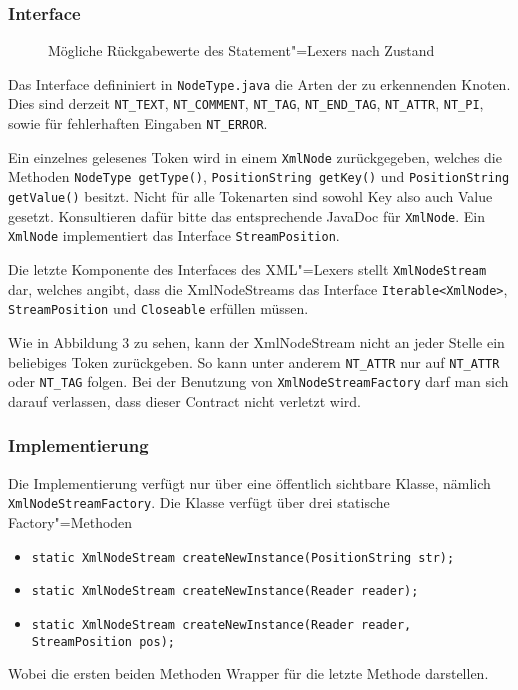 \documentclass[10pt,a4paper,ngerman,titlepage,tocindentauto]{scrartcl}
\newcommand{\n}{\linebreak[1]}
\begin{document}
			\subsubsection*{Interface}
				\begin{wrapfigure}{R}{0.3\textwidth}
					\caption{Mög\-li\-che Rück\-ga\-be\-wer\-te des State\-ment"=Le\-xers nach Zu\-stand}
					\fbox{\centering
						\texttt{[image: graphiken/Ausgaben.pdf]}
					}
				\end{wrapfigure}
				
				Das Interface defininiert in \texttt{NodeType.java} die Arten der zu erkennenden Knoten.
				Dies sind derzeit \texttt{NT\_TEXT}, \texttt{NT\_COMMENT}, \texttt{NT\_TAG}, \texttt{NT\_END\_TAG},
				\texttt{NT\_ATTR}, \texttt{NT\_PI}, sowie für fehlerhaften Eingaben \texttt{NT\_ERROR}.
				
				Ein einzelnes gelesenes Token wird in einem \texttt{XmlNode} zurückgegeben, welches die Methoden
				\texttt{NodeType getType()}, \texttt{PositionString getKey()} und \texttt{PositionString getValue()}
				besitzt. Nicht für alle Tokenarten sind sowohl Key also auch Value gesetzt. Konsultieren dafür
				bitte das entsprechende JavaDoc für \texttt{XmlNode}. Ein \texttt{XmlNode} implementiert das Interface
				\texttt{StreamPosition}.
				
				Die letzte Komponente des Interfaces des XML"=Lexers stellt \texttt{XmlNodeStream} dar, welches
				angibt, dass die XmlNodeStreams das Interface \texttt{Iterable<{\n}XmlNode>}, \texttt{StreamPosition} und
				\texttt{Closeable} erfüllen müssen.
				
				Wie in Abbildung 3 zu sehen, kann der XmlNodeStream nicht an jeder Stelle ein beliebiges Token zurückgeben.
				So kann unter anderem \texttt{NT\_ATTR} nur auf \texttt{NT\_ATTR} oder \texttt{NT\_TAG} folgen.
				Bei der Benutzung von \texttt{XmlNodeStreamFactory} darf man sich darauf verlassen, dass dieser Contract
				nicht verletzt wird.
			
			\subsubsection*{Implementierung}
				Die Implementierung verfügt nur über eine öffentlich sichtbare Klasse, nämlich \texttt{Xml\-Node\-Stream\-Factory}.
				Die Klasse verfügt über drei statische Factory"=Methoden
				\begin{itemize}
					\item \texttt{static XmlNodeStream createNewInstance(PositionString str);}
					\item \texttt{static XmlNodeStream createNewInstance(Reader reader);}
					\item \texttt{static XmlNodeStream createNewInstance(Reader reader, StreamPosition pos);}
				\end{itemize}
				Wobei die ersten beiden Methoden Wrapper für die letzte Methode darstellen.
	
\end{document}
